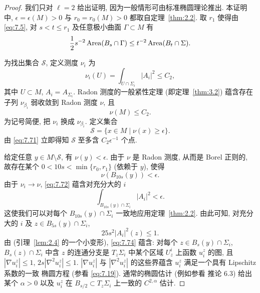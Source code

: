 \begin{proof}
我们只对 $\ell=2$ 给出证明, 因为一般情形可由标准椭圆理论推出. 本证明
中, $\epsilon=\epsilon(M)>0$ 与 $r_0=r_0(M)>0$ 都取自定理~\ref{thm:2.2}. 取 $r_1$
使得由 \eqref{eq:7.5}, 对 $s<t\leq r_1$ 及任意极小曲面 $\Gamma\subset M$
有
\begin{equation}
\frac12s^{-2}\operatorname{Area}(B_s\cap\Gamma)
\leq t^{-2}\operatorname{Area}(B_t\cap\Sigma).
\label{eq:7.69}
\end{equation}

为找出集合 $\mathcal{S}$, 定义测度 $\nu_i$ 为
\begin{equation}
\nu_i(U)=\int_{U\cap\Sigma_i}|A_i|^2\leq C_2,
\label{eq:7.70}
\end{equation}
其中 $U\subset M$, $A_i=A_{\Sigma_i}$. Radon 测度的一般紧性定理 (即定理~\ref{thm:3.2})
蕴含存在子列 $\nu_{\beta_i}$ 弱收敛到 Radon 测度 $\nu$, 且
\begin{equation}
\nu(M)\leq C_2.
\label{eq:7.71}
\end{equation}
为记号简便, 把 $\nu_i$ 换成 $\nu_{\beta_i}$. 定义集合
\[
\mathcal{S}=\{x\in M\mid\nu(x)\geq\epsilon\}.
\]
由 \eqref{eq:7.71} 立即得知 $\mathcal{S}$ 至多含 $C_2\epsilon^{-1}$ 个点.

给定任意 $y\in M\setminus\mathcal{S}$, 有 $\nu(y)<\epsilon$. 由于 $\nu$ 是
Radon 测度, 从而是 Borel 正则的, 故存在某个 $0<10s<\min\{r_0,r_1\}$
(依赖于 $y$), 使得
\begin{equation}
\nu(B_{10s}(y))<\epsilon.
\label{eq:7.72}
\end{equation}
由于 $\nu_i\to\nu$, \eqref{eq:7.72} 蕴含对充分大的 $i$
\begin{equation}
\int_{B_{10s}(y)\cap\Sigma_i}|A_i|^2<\epsilon.
\label{eq:7.73}
\end{equation}
这使我们可以对每个 $B_{10s}(y)\cap\Sigma_i$ 一致地应用定理~\ref{thm:2.2}. 由此可知,
对充分大的 $i$ 及 $z\in B_{5s}(y)\cap\Sigma_i$,
\begin{equation}
25s^2|A_i|^2(z)\leq1.
\label{eq:7.74}
\end{equation}
由 (引理~\ref{lem:2.4} 的一个小变形), \eqref{eq:7.74} 蕴含: 对每个
$z\in B_s(y)\cap\Sigma_i$, $B_s(z)\cap\Sigma_i$ 中含 $z$ 的连通分支是
$T_z\Sigma_i$ 中某个区域 $U_z^i$ 上函数 $u_i^z$ 的图, 且
$|\nabla u_i^z|\leq1$, $2s|\nabla^2u_i^z|\leq1$. $|\nabla u_i^z|$ 与
$|\nabla^2u_i^z|$ 的这些界蕴含 $u_i^z$ 满足一个具有 Lipschitz 系数的一致
椭圆方程 (参看 \eqref{eq:7.19}). 通常的椭圆估计 (例如参看 \cite{GiTr}
推论 6.3) 给出某个 $\alpha>0$ 以及 $u_i^z$ 在 $B_{s/2}\subset T_z\Sigma_i$
上一致的 $C^{2,\alpha}$ 估计.


\end{proof}
